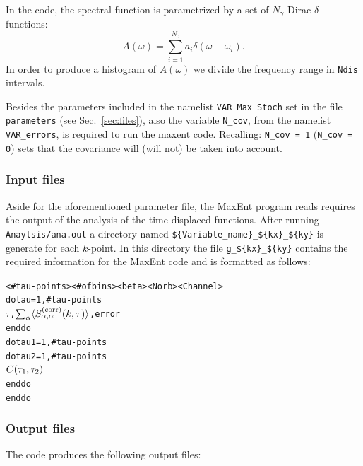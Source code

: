 In the code, the spectral function is parametrized  by a  set of $N_{\gamma}$ Dirac $\delta$ functions: 
\begin{equation}
      A(\omega)  = \sum_{i=1}^{N_{\gamma}} a_{i} \delta \left( \omega - \omega_i \right).
\end{equation}
In order to produce a histogram of  $ A(\omega) $ we divide  the frequency range in \texttt{Ndis} intervals. 

Besides the parameters included in the namelist \texttt{VAR\_Max\_Stoch} set in the file \texttt{parameters} (see Sec.~\ref{sec:files}), also the variable \texttt{N\_cov}, from the namelist \texttt{VAR\_errors}, is required to run the maxent code. Recalling: \texttt{N\_cov = 1} (\texttt{N\_cov = 0}) sets that the covariance will (will not) be taken into account.

\subsubsection*{Input files} 
Aside for the aforementioned parameter file,  the  MaxEnt program reads requires the output of the  analysis of the time displaced functions. After running \texttt{Anaylsis/ana.out} a directory named    \texttt{\$\{Variable\_name\}}\texttt{\_\$\{kx\}\_\$\{ky\}}   is  generate for each $k$-point.  In this directory  the file \texttt{g\_\$\{kx\}\_\$\{ky\}} contains the  required information for the MaxEnt code  and is  formatted as follows:
\begin{alltt}
 < # tau-points >  <# of bins >  <beta>  <Norb>  <Channel>
do tau = 1,  # tau-points
   \( \tau \),  \( \sum\sb{\alpha}\langle{S}\sb{\alpha,\alpha}\sp{(\mathrm{corr})}(k,\tau)\rangle\),   error
enddo
do tau1 = 1,  # tau-points
  do tau2 = 1,  # tau-points
     \( C( \tau\sb{1},\tau\sb{2} ) \)
  enddo
enddo
\end{alltt}



\subsubsection*{Output files}

The code produces the following output files:

